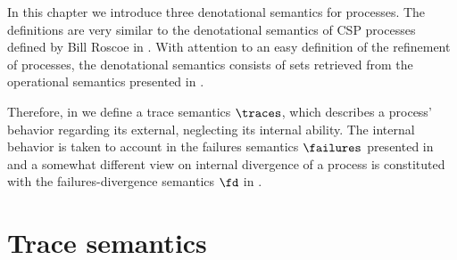 In this chapter we introduce three denotational semantics for \picalc{} processes. The definitions are very similar to the denotational semantics of \gls{CSP} processes defined by Bill Roscoe in \cite{roscoe}. With attention to an easy definition of the refinement of \picalc{} processes, the denotational semantics consists of sets retrieved from the operational semantics presented in .

Therefore, in  we define a trace semantics $\traces$, which describes a process' behavior regarding its external, neglecting its internal ability. The internal behavior is taken to account in the failures semantics $\failures$ presented in  and a somewhat different view on internal divergence of a process is constituted with the failures-divergence semantics $\fd$ in .

\section{Trace semantics}
\label{sec_de_sem_trace}


%


%

